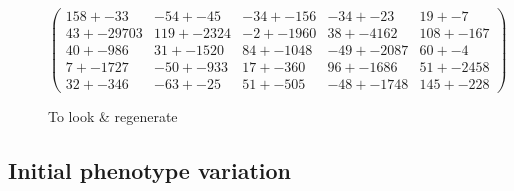 \documentclass[]{report} %
\begin{document}
    \paragraph*{}
   

    \begin{figure}[H] 
            \centering
            \small
    $
          \begin{pmatrix}
                158 +- 33 & -54 +- 45 & -34 +- 156 & -34 +- 23 & 19 +- 7 \\
                43 +- 29703 & 119 +- 2324 & -2 +- 1960 & 38 +- 4162 & 108 +- 167 \\
                40 +- 986 & 31 +- 1520 & 84 +- 1048 & -49 +- 2087 & 60 +- 4 \\
                7 +- 1727 & -50 +- 933 & 17 +- 360 & 96 +- 1686 & 51 +- 2458 \\
                32 +- 346 & -63 +- 25 & 51 +- 505 & -48 +- 1748 & 145 +- 228 
           \end{pmatrix}
    $
            \caption{\footnotesize To look \& regenerate}
            \label{mat:ps300xg200xmr1-10-4xprt300}
    \end{figure}
    
    
    
    
    \subsection{Initial phenotype variation}
\end{document}
